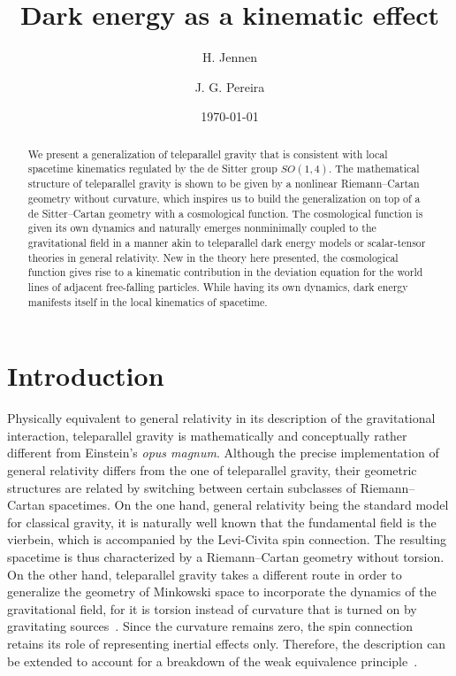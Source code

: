 \documentclass[%
aps,
prd,
reprint
]{revtex4-1}
\begin{document}
\title{Dark energy as a kinematic effect}
\author{H. Jennen}
\author{J. G. Pereira}
\date{\today}

\begin{abstract}
We present a generalization of teleparallel gravity that is 
consistent with local spacetime kinematics regulated by the de 
Sitter group $SO(1,4)$. The mathematical structure of 
teleparallel gravity is shown to be given by a nonlinear 
Riemann--Cartan geometry without curvature, which inspires us to 
build the generalization on top of a de Sitter--Cartan geometry 
with a cosmological function. The cosmological function is given 
its own dynamics and naturally emerges nonminimally coupled to 
the gravitational field in a manner akin to teleparallel dark 
energy models or scalar-tensor theories in general relativity.  
New in the theory here presented, the cosmological function gives 
rise to a kinematic contribution in the deviation equation for 
the world lines of adjacent free-falling particles. While having 
its own dynamics, dark energy manifests itself in the local 
kinematics of spacetime.
\end{abstract}

\maketitle

\section{Introduction}

Physically equivalent to general relativity in its description of 
the gravitational interaction, teleparallel gravity is 
mathematically and conceptually rather different from Einstein's 
\emph{opus magnum}. Although the precise implementation of 
general relativity differs from the one of teleparallel gravity, 
their geometric structures are related by switching between 
certain subclasses of Riemann--Cartan spacetimes. On the one 
hand, general relativity being the standard model for classical 
gravity, it is naturally well known that the fundamental field is 
the vierbein, which is accompanied by the Levi-Civita spin 
connection. The resulting spacetime is thus characterized by 
a Riemann--Cartan geometry without torsion. On the other hand, 
teleparallel gravity takes a different route in order to 
generalize the geometry of Minkowski space to incorporate the 
dynamics of the gravitational field, for it is torsion instead of 
curvature that is turned on by gravitating 
sources~\cite{aldrovandi:2012tele}. Since the curvature remains 
zero, the spin connection retains its role of representing 
inertial effects only. Therefore, the description can be extended 
to account for a breakdown of the weak equivalence 
principle~\cite{Aldrovandi:2003pa}.
\end{document}
